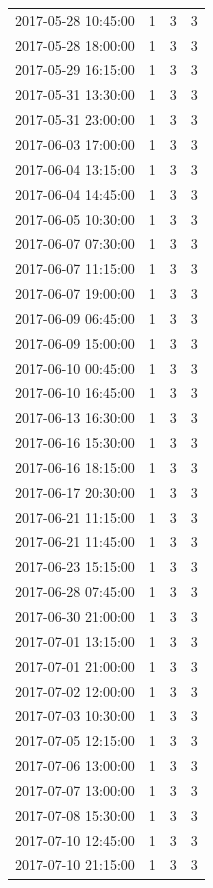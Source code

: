 \begin{tabular}{lrrr}
2017-05-28 10:45:00 & 1 & 3 & 3 \\
2017-05-28 18:00:00 & 1 & 3 & 3 \\
2017-05-29 16:15:00 & 1 & 3 & 3 \\
2017-05-31 13:30:00 & 1 & 3 & 3 \\
2017-05-31 23:00:00 & 1 & 3 & 3 \\
2017-06-03 17:00:00 & 1 & 3 & 3 \\
2017-06-04 13:15:00 & 1 & 3 & 3 \\
2017-06-04 14:45:00 & 1 & 3 & 3 \\
2017-06-05 10:30:00 & 1 & 3 & 3 \\
2017-06-07 07:30:00 & 1 & 3 & 3 \\
2017-06-07 11:15:00 & 1 & 3 & 3 \\
2017-06-07 19:00:00 & 1 & 3 & 3 \\
2017-06-09 06:45:00 & 1 & 3 & 3 \\
2017-06-09 15:00:00 & 1 & 3 & 3 \\
2017-06-10 00:45:00 & 1 & 3 & 3 \\
2017-06-10 16:45:00 & 1 & 3 & 3 \\
2017-06-13 16:30:00 & 1 & 3 & 3 \\
2017-06-16 15:30:00 & 1 & 3 & 3 \\
2017-06-16 18:15:00 & 1 & 3 & 3 \\
2017-06-17 20:30:00 & 1 & 3 & 3 \\
2017-06-21 11:15:00 & 1 & 3 & 3 \\
2017-06-21 11:45:00 & 1 & 3 & 3 \\
2017-06-23 15:15:00 & 1 & 3 & 3 \\
2017-06-28 07:45:00 & 1 & 3 & 3 \\
2017-06-30 21:00:00 & 1 & 3 & 3 \\
2017-07-01 13:15:00 & 1 & 3 & 3 \\
2017-07-01 21:00:00 & 1 & 3 & 3 \\
2017-07-02 12:00:00 & 1 & 3 & 3 \\
2017-07-03 10:30:00 & 1 & 3 & 3 \\
2017-07-05 12:15:00 & 1 & 3 & 3 \\
2017-07-06 13:00:00 & 1 & 3 & 3 \\
2017-07-07 13:00:00 & 1 & 3 & 3 \\
2017-07-08 15:30:00 & 1 & 3 & 3 \\
2017-07-10 12:45:00 & 1 & 3 & 3 \\
2017-07-10 21:15:00 & 1 & 3 & 3 \\

\end{tabular}
